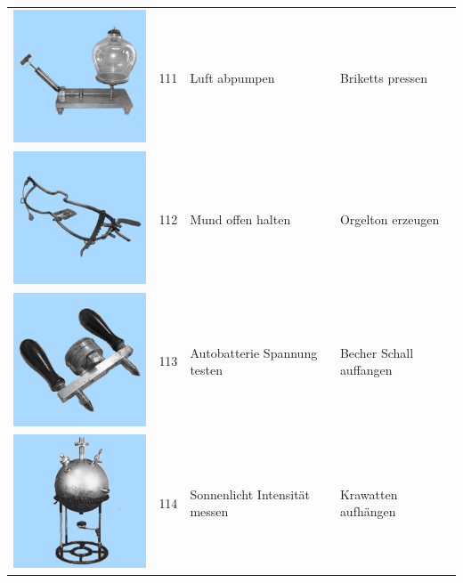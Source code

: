 \documentclass[
  english,
  man,floatsintext]{apa7}
\begin{document}
\begin{center}
\begin{ThreePartTable}
\begin{longtable}{llll}
\includegraphics[valign=c, scale=0.19]{../materials/unfamiliar/111.png} & 111 & Luft abpumpen & Briketts pressen\\
\includegraphics[valign=c, scale=0.19]{../materials/unfamiliar/112.png} & 112 & Mund offen halten & Orgelton erzeugen\\
\includegraphics[valign=c, scale=0.19]{../materials/unfamiliar/113.png} & 113 & Autobatterie Spannung testen & Becher Schall auffangen\\
\includegraphics[valign=c, scale=0.19]{../materials/unfamiliar/114.png} & 114 & Sonnenlicht Intensität messen & Krawatten aufhängen\\

\end{longtable}
\end{ThreePartTable}
\end{center}
\end{document}
